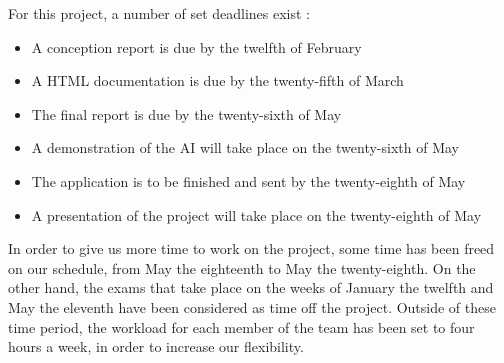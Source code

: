 For this project, a number of set deadlines exist :
\begin{itemize}
	\item A conception report is due by the twelfth of February
	\item A HTML documentation is due by the twenty-fifth of March
	\item The final report  is due by the twenty-sixth of May
	\item A demonstration of the AI will take place on the twenty-sixth of May
	\item The application is to be finished and sent by the twenty-eighth of May
	\item A presentation of the project will take place on the twenty-eighth of May
\end{itemize}

In order to give us more time to work on the project, some time has been freed on our schedule, from May the eighteenth to May the twenty-eighth.
On the other hand, the exams that take place on the weeks of January the twelfth and May the eleventh have been considered as time off the project. 
Outside of these time period, the workload for each member of the team has been set to four hours a week, in order to increase our flexibility.
